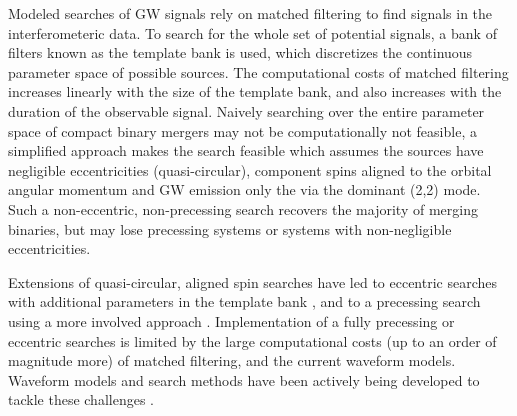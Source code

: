 
Modeled searches of GW signals rely on matched filtering to find signals in the interferometeric data. To search for the whole set of potential signals, a bank of filters known as the template bank is used, which discretizes the continuous parameter space of possible sources. The computational costs of matched filtering increases linearly with the size of the template bank, and also increases with the duration of the observable signal. Naively searching over the entire parameter space of compact binary mergers may not be computationally not feasible, a simplified approach makes the search feasible which assumes the sources have negligible eccentricities (quasi-circular), component spins aligned to the orbital angular momentum and GW emission only the via the dominant (2,2) mode. Such a non-eccentric, non-precessing search recovers the majority of merging binaries, but may lose precessing systems or systems with non-negligible eccentricities.   

Extensions of quasi-circular, aligned spin searches have led to eccentric searches with additional parameters in the template bank \cite{Nitz:2021vqh,Wang:2021qsu}, and to a precessing search using a more involved approach \cite{McIsaac:2023ijd}. Implementation of a fully precessing or eccentric searches is limited by the large computational costs (up to an order of magnitude more) of matched filtering, and the current waveform models. Waveform models and search methods have been actively being developed to tackle these challenges \cite{McIsaac:2023ijd, Klein:2021jtd, Joshi:2022ocr}. 

